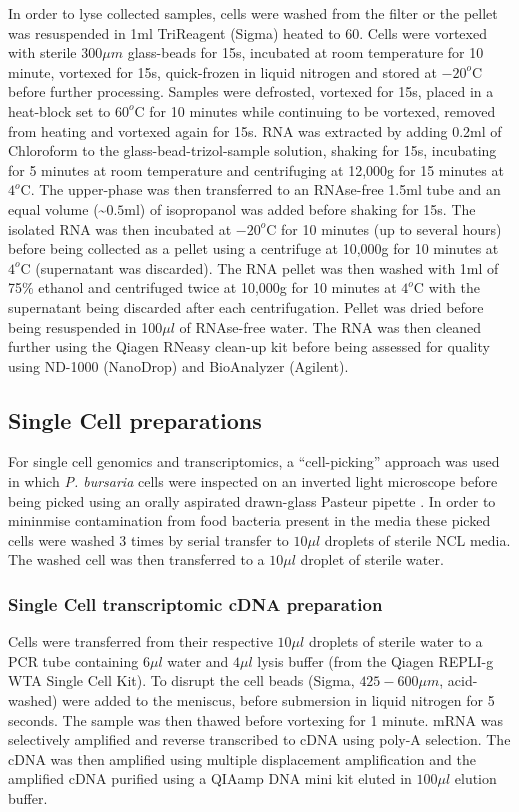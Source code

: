 In order to lyse collected samples, cells were washed from the filter or the 
pellet was resuspended in 1ml TriReagent (Sigma) heated to \(60\)\celsius. 
Cells were vortexed with sterile 300$\mu m$ glass-beads for 15s, incubated at 
room temperature for 10 minute, vortexed for 15s, quick-frozen in liquid 
nitrogen and stored at $-20^{o}$C before further processing.  
Samples were defrosted, vortexed for 15s, placed in a heat-block set 
to $60^{o}$C for 10 minutes while continuing to be vortexed, removed from 
heating and vortexed again for 15s.  
RNA was extracted by adding 0.2ml of Chloroform to the glass-bead-trizol-sample 
solution, shaking for 15s, incubating for 5 minutes at room temperature and 
centrifuging at 12,000g for 15 minutes at $4^{o}$C.  
The upper-phase was then transferred to an RNAse-free 1.5ml tube and an 
equal volume (\textasciitilde$0.5$ml) of isopropanol was added before shaking for 15s.  
The isolated RNA was then incubated at $-20^{o}$C for 10 minutes 
(up to several hours) before being collected as a pellet using a centrifuge at 
10,000g for 10 minutes at $4^{o}$C (supernatant was discarded). 
The RNA pellet was then washed with 1ml of 75\% ethanol and centrifuged 
twice at 10,000g for 10 minutes at $4^{o}$C with the supernatant being 
discarded after each centrifugation.  
Pellet was dried before being resuspended in 100$\mu l$ of RNAse-free water.  
The RNA was then cleaned further using the Qiagen RNeasy clean-up kit 
before being assessed for quality using ND-1000 (NanoDrop) and BioAnalyzer (Agilent).

\subsection{Single Cell preparations}

For single cell genomics and transcriptomics, a ``cell-picking'' approach was used in which
\textit{P. bursaria} cells were inspected on an inverted light microscope before being picked
using an orally aspirated drawn-glass Pasteur pipette \citep{Garcia-Cuetos2012}.
In order to mininmise contamination from food bacteria present in the media these picked cells
were washed 3 times by serial transfer to \(10\mu l\) droplets of sterile NCL media.
The washed cell was then transferred to a \(10\mu l\) droplet of sterile water.

\subsubsection{Single Cell transcriptomic cDNA preparation}
Cells were transferred from their respective \(10\mu l\) droplets of sterile water to
a PCR tube containing \(6\mu l\) water and \(4\mu l \) lysis buffer (from the Qiagen
REPLI-g WTA Single Cell Kit). To disrupt the cell beads (Sigma, \(425-600\mu m\), acid-washed)
were added to the meniscus, before submersion in liquid nitrogen for 5 seconds.  The sample was 
then thawed before vortexing for 1 minute.  
mRNA was selectively amplified and reverse transcribed to cDNA using poly-A selection.  The cDNA
was then amplified using multiple displacement amplification and the amplified cDNA purified
using a QIAamp DNA mini kit eluted in \(100\mu l\) elution buffer.

